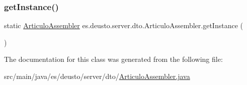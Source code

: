 \mbox{\label{classes_1_1deusto_1_1server_1_1dto_1_1_articulo_assembler_a5c5874d4651ceab1ae0feb08ceeaadad}} 
\subsubsection{\texorpdfstring{getInstance()}{getInstance()}}
{\footnotesize\ttfamily static \mbox{\hyperlink{classes_1_1deusto_1_1server_1_1dto_1_1_articulo_assembler}{Articulo\+Assembler}} es.\+deusto.\+server.\+dto.\+Articulo\+Assembler.\+get\+Instance (\begin{DoxyParamCaption}{ }\end{DoxyParamCaption})\hspace{0.3cm}{\ttfamily [static]}}



The documentation for this class was generated from the following file\+:\begin{DoxyCompactItemize}
\item 
src/main/java/es/deusto/server/dto/\mbox{\hyperlink{_articulo_assembler_8java}{Articulo\+Assembler.\+java}}\end{DoxyCompactItemize}
